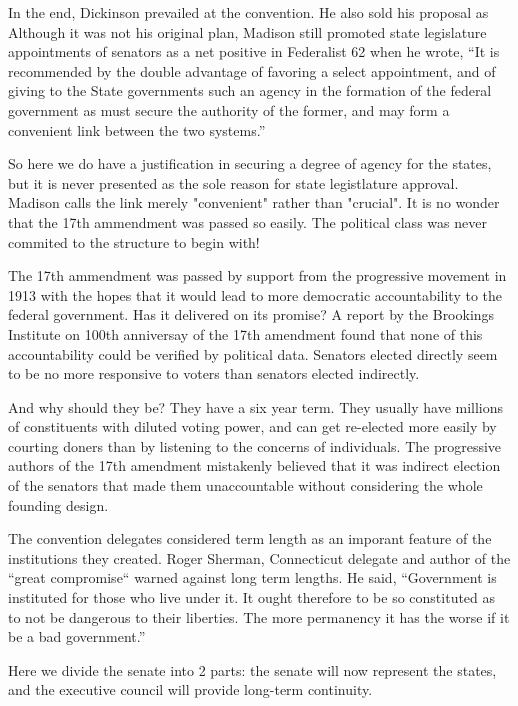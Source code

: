 \documentclass{article}
\begin{document}
In the end, Dickinson prevailed at the convention. He also sold his proposal as Although it was not his original plan, Madison still promoted state legislature appointments of senators as a net positive in Federalist 62 when he wrote, “It is recommended by the double advantage of favoring a select appointment, and of giving to the State governments such an agency in the formation of the federal government as must secure the authority of the former, and may form a convenient link between the two systems.”\cite{Federalist62}

So here we do have a justification in securing a degree of agency for the states, but it is never presented as the sole reason for state legistlature approval. Madison calls the link merely "convenient" rather than "crucial". It is no wonder that the 17th ammendment was passed so easily. The political class was never commited to the structure to begin with!

The 17th ammendment was passed by support from the progressive movement in 1913 with the hopes that it would lead to more democratic accountability to the federal government\cite{Eisinger}. Has it delivered on its promise? A report by the Brookings Institute on 100th anniversay of the 17th amendment found that none of this accountability could be verified by political data\cite{Schiller}. Senators elected directly seem to be no more responsive to voters than senators elected indirectly.

And why should they be? They have a six year term. They usually have millions of constituents with diluted voting power, and can get re-elected more easily by courting doners than by listening to the concerns of individuals. The progressive authors of the 17th amendment mistakenly believed that it was indirect election of the senators that made them unaccountable without considering the whole founding design.

The convention delegates considered term length as an imporant feature of the institutions they created. Roger Sherman, Connecticut delegate and author of the “great compromise“ warned against long term lengths. He said, “Government is instituted for those who live under it. It ought therefore to be so constituted as to not be dangerous to their liberties. The more permanency it has the worse if it be a bad government.”\cite{Madison}

Here we divide the senate into 2 parts: the senate will now represent the states, and the executive council will provide long-term continuity.
\end{document}
